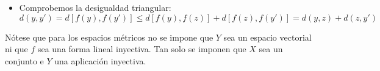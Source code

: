 \begin{ejercicio}
\begin{itemize}
        \item Comprobemos la desigualdad triangular:
        \begin{equation*}
            d(y,y') = d[f(y), f(y')] \leq d[f(y), f(z)]+ d[f(z), f(y')] = d(y,z) + d(z,y')
        \end{equation*}
    \end{itemize}
    Nótese que para los espacios métricos no se impone que $Y$ sea un espacio vectorial ni que $f$ sea una forma lineal inyectiva. Tan solo se imponen que $X$ sea un conjunto e $Y$ una aplicación inyectiva.
\end{ejercicio}

